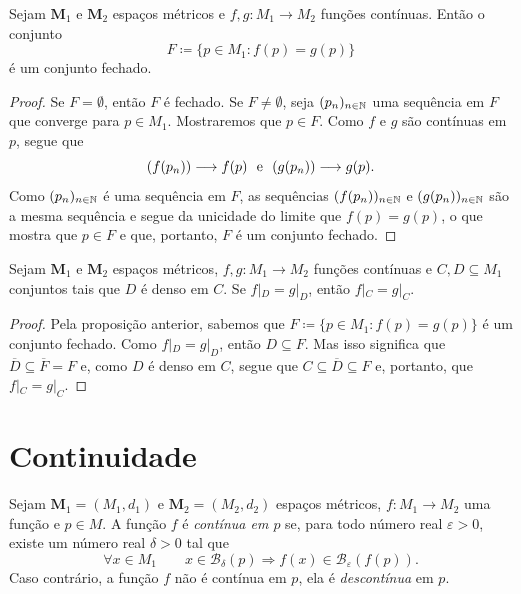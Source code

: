 \begin{prop}
	Sejam $\bm M_1$ e $\bm M_2$ espaços métricos e $f,g: M_1 \to M_2$ funções contínuas. Então o conjunto 
	\begin{equation*}
	F \coloneqq \{p \in M_1 : f(p)=g(p)\}
	\end{equation*}
é um conjunto fechado.
\end{prop}
\begin{proof}
	Se $F=\emptyset$, então $F$ é fechado. Se $F \neq \emptyset$, seja $(p_n)_{n \in \mathbb{N}}$ uma sequência em $F$ que converge para $p \in M_1$. Mostraremos que $p \in F$. Como $f$ e $g$ são contínuas em $p$, segue que
	\begin{equation*}
	(f(p_n)) \longrightarrow f(p) \text{\ \ e\ \ } (g(p_n)) \longrightarrow g(p).
	\end{equation*}
	Como $(p_n)_{n \in \mathbb{N}}$ é uma sequência em $F$, as sequências $(f(p_n))_{n \in \mathbb{N}}$ e $(g(p_n))_{n \in \mathbb{N}}$ são a mesma sequência e segue da unicidade do limite que $f(p)=g(p)$, o que mostra que $p \in F$ e que, portanto, $F$ é um conjunto fechado.
\end{proof}

\begin{prop}
	Sejam $\bm M_1$ e $\bm M_2$ espaços métricos, $f,g: M_1 \to M_2$ funções contínuas e $C,D \subseteq M_1$ conjuntos tais que $D$ é denso em $C$. Se $f|_D = g|_D$, então $f|_C = g|_C$.
\end{prop}
\begin{proof}
	Pela proposição anterior, sabemos que $F \coloneqq \{p \in M_1 : f(p)=g(p)\}$ é um conjunto fechado. Como $f|_D = g|_D$, então $D \subseteq F$. Mas isso significa que $\overline D \subseteq \overline F = F$ e, como $D$ é denso em $C$, segue que $C \subseteq \overline D \subseteq F$ e, portanto, que $f|_C = g|_C$. 
\end{proof}


\section{Continuidade}

\begin{defi}
	Sejam $\bm M_1 = (M_1,d_1)$ e $\bm M_2 = (M_2,d_2)$ espaços métricos, $f: M_1 \to M_2$ uma função e $p \in M$. A função $f$ é \emph{contínua em $p$} se, para todo número real $\varepsilon > 0$, existe um número real $\delta > 0$ tal que
	\begin{equation*}
	\forall x \in M_1 \qquad x \in \mathcal B_\delta(p) \Rightarrow f(x) \in \mathcal B_\varepsilon(f(p)).
	\end{equation*}
Caso contrário, a função $f$ não é contínua em $p$, ela é \emph{descontínua} em $p$.
\end{defi}


